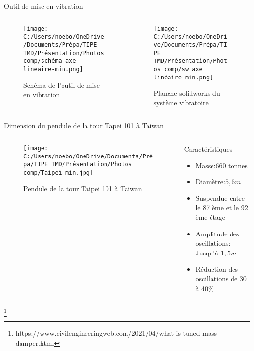 \documentclass{beamer}
\begin{document}
\begin{frame}{Outil de mise en vibration}

	\begin{columns}
		\begin{column}{0.5\textwidth}
			\begin{figure}
				\texttt{[image: C:/Users/noebo/OneDrive/Documents/Prépa/TIPE TMD/Présentation/Photos comp/schéma axe lineaire-min.png]}
				\caption{Schéma de l'outil de mise en vibration}
			\end{figure}
		\end{column}
		\begin{column}{0.5\textwidth}
			\begin{figure}
				\texttt{[image: C:/Users/noebo/OneDrive/Documents/Prépa/TIPE TMD/Présentation/Photos comp/sw axe linéaire-min.png]}
				\caption{Planche solidworks du système vibratoire}
			\end{figure}
		\end{column}
	\end{columns}
\end{frame}

\begin{frame}{Dimension du pendule de la tour Tapei 101 à Taiwan}
		\begin{columns}
		\begin{column}{0.5\textwidth}
			\begin{figure}
				\texttt{[image: C:/Users/noebo/OneDrive/Documents/Prépa/TIPE TMD/Présentation/Photos comp/Taipeï-min.jpg]}
				\caption{Pendule de la tour Taipei 101 à Taiwan}
			\end{figure}
		\end{column}
		\begin{column}{0.5\textwidth}
			Caractéristiques:
			\begin{itemize}
				\item Masse:$660$ tonnes
				\item Diamètre:$5,5 m$
				\item Suspendue entre le 87 ème et le 92 ème étage
				\item Amplitude des oscillations: Jusqu'à $1,5m$
				\item Réduction des oscillations de 30 à 40\%
				
				
			\end{itemize}	
		\end{column}
	\end{columns}
\footnote{\tiny https://www.civilengineeringweb.com/2021/04/what-is-tuned-mass-damper.html}
\end{frame}
\end{document}
